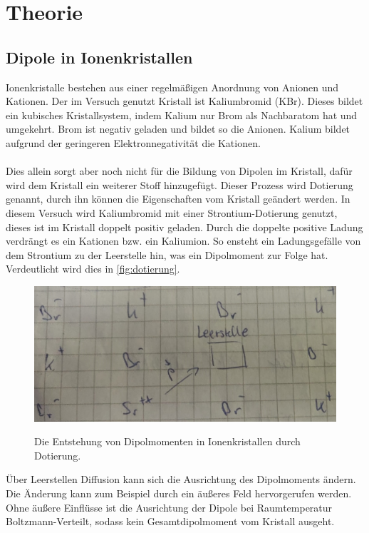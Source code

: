 \section{Theorie}
\label{sec:Theorie}

\subsection{Dipole in Ionenkristallen}
Ionenkristalle bestehen aus einer regelmäßigen Anordnung von Anionen und Kationen.
Der im Versuch genutzt Kristall ist Kaliumbromid (KBr).
Dieses bildet ein kubisches Kristallsystem, indem Kalium nur Brom als Nachbaratom hat und umgekehrt.
Brom ist negativ geladen und bildet so die Anionen.
Kalium bildet aufgrund der geringeren Elektronnegativität die Kationen.
\\\\
Dies allein sorgt aber noch nicht für die Bildung von Dipolen im Kristall, dafür wird dem Kristall ein weiterer Stoff hinzugefügt.
Dieser Prozess wird Dotierung genannt, durch ihn können die Eigenschaften vom Kristall geändert werden.
In diesem Versuch wird Kaliumbromid mit einer Strontium-Dotierung genutzt, dieses ist im Kristall doppelt positiv geladen.
Durch die doppelte positive Ladung verdrängt es ein Kationen bzw. ein Kaliumion.
So ensteht ein Ladungsgefälle von dem Strontium zu der Leerstelle hin, was ein Dipolmoment zur Folge hat.
Verdeutlicht wird dies in \autoref{fig:dotierung}.
\begin{figure}
    \centering
    \caption{Die Entstehung von Dipolmomenten in Ionenkristallen durch Dotierung.}
    \includegraphics[width=\textwidth]{content/data/dotierung.jpeg}
    \label{fig:dotierung}
\end{figure}
Über Leerstellen Diffusion kann sich die Ausrichtung des Dipolmoments ändern.
Die Änderung kann zum Beispiel durch ein äußeres Feld hervorgerufen werden.
Ohne äußere Einflüsse ist die Ausrichtung der Dipole bei Raumtemperatur Boltzmann-Verteilt, sodass kein Gesamtdipolmoment vom Kristall ausgeht.
